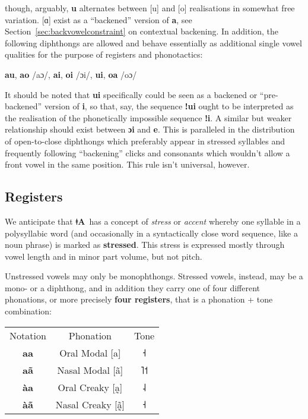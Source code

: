 \documentclass[11pt]{book}
\newcommand{\qcn}[1]{\textbf{#1}}
\newcommand{\langname}{\qcn{ǂA}~}
\begin{document}
though, arguably, \qcn{u} alternates between [u] and [o] realisations in somewhat free variation. [ɑ] exist as a ``backened'' version of \qcn{a}, see Section~\ref{sec:backvowelconstraint} on contextual backening. In addition, the following diphthongs are allowed and behave essentially as additional single vowel qualities for the purpose of registers and phonotactics:

\begin{center}
\qcn{au}, \qcn{ao} /aɔ/, \qcn{ai}, \qcn{oi} /ɔi/, \qcn{ui}, \qcn{oa} /oɔ/
\end{center}

It should be noted that \qcn{ui} specifically could be seen as a backened or ``pre-backened'' version of \qcn{i}, so that, say, the sequence \qcn{ǃui} ought to be interpreted as the realisation of the phonetically impossible sequence \qcn{ǃi}. A similar but weaker relationship should exist between \qcn{ɔi} and \qcn{e}. This is paralleled in the distribution of open-to-close diphthongs which preferably appear in stressed syllables and frequently following ``backening'' clicks and consonants which wouldn't allow a front vowel in the same position. This rule isn't universal, however.

\subsection{Registers}

We anticipate that \langname has a concept of \emph{stress} or \emph{accent} whereby one syllable in a polysyllabic word (and occasionally in a syntactically close word sequence, like a noun phrase) is marked as \textbf{stressed}. This stress is expressed mostly through vowel length and in minor part volume, but not pitch.

Unstressed vowels may only be monophthongs. Stressed vowels, instead, may be a mono- or a diphthong, and in addition they carry one of four different phonations, or more precisely \textbf{four registers}, that is a phonation + tone combination:

\begin{center}
\begin{tabular}{c c c}
	Notation & Phonation & Tone\\
	\qcn{aa} & Oral Modal [a] & ˧\\
	\qcn{aã} & Nasal Modal [ã] & ˥˦\\
	\qcn{àa} & Oral Creaky [a̰] & ˨\\
	\qcn{àã} & Nasal Creaky [ã̰]& ˧\\
\end{tabular}
\end{center}
\end{document}
